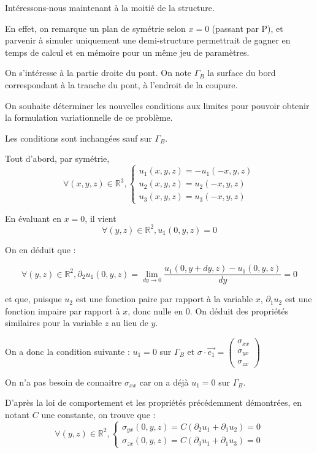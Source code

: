 

Intéressons-nous maintenant à la moitié de la structure. 

En effet, on remarque un plan de symétrie selon $x=0$ (passant par P), 
et parvenir à simuler uniquement une demi-structure permettrait de gagner en temps de calcul et en mémoire pour un même jeu de paramètres.

On s'intéresse à la partie droite du pont. On note $\Gamma_B$ la surface du bord correspondant à la tranche du pont, à l'endroit de la coupure.

On souhaite déterminer les nouvelles conditions aux limites pour pouvoir obtenir la formulation variationnelle de ce problème.

Les conditions sont inchangées sauf sur $\Gamma_B$.

Tout d'abord, par symétrie, 
$$\forall (x,y,z) \in \mathbb{R}^3,
\begin{cases}
 u_1(x,y,z) = - u_1(-x,y,z)\\
 u_2(x,y,z) = u_2(-x,y,z)\\
 u_3(x,y,z) = u_3(-x,y,z)
\end{cases}
$$

En évaluant en $x=0$, il vient
$$\forall (y,z) \in \mathbb{R}^2, u_1(0,y,z) = 0$$

On en déduit que :

$$\forall (y,z) \in \mathbb{R}^2, \partial_2 u_1 (0, y, z) = \lim_{dy\rightarrow 0} \frac{u_1(0,y+dy,z)-u_1(0,y,z)}{dy}=0$$

et que, puisque $u_2$ est une fonction paire par rapport à la variable $x$, $\partial_1 u_2$ est une fonction impaire par rapport à $x$, 
donc nulle en $0$. On déduit des propriétés similaires pour la variable $z$ au lieu de $y$.

On a donc la condition suivante : $u_1 = 0$ sur $\Gamma_B$ et $\sigma \cdot \vec{e_1}=
\begin{pmatrix}
    \sigma_{xx}\\
    \sigma_{yx}\\
    \sigma_{zx}
\end{pmatrix}$

On n'a pas besoin de connaitre $\sigma_{xx}$ car on a déjà $u_1 = 0$ sur $\Gamma_B$. 

D'après la loi de comportement et les propriétés précédemment démontrées, en notant $C$ une constante, on trouve que :
 $$
 \forall (y,z) \in \mathbb{R}^2,
 \begin{cases}
    \sigma_{yx}(0, y, z) = C (\partial_2 u_1 + \partial_1 u_2) = 0\\
    \sigma_{zx}(0, y, z) = C (\partial_3 u_1 + \partial_1 u_3) = 0
 \end{cases}
$$

